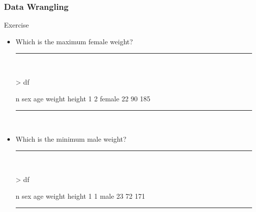 \documentclass{beamer}
\begin{document}
\begin{frame}[fragile]
	\frametitle{Data Wrangling}
	\centering \LARGE Exercise
	\begin{itemize}
		\small
		\item Which is the maximum female weight? 
\rule{\textwidth}{0.4pt}\\
\tiny
\setlength{\fancyvrbtopsep}{-1pt}
\setlength{\fancyvrbpartopsep}{-1pt}
\begin{Schunk}
\begin{Sinput}
> df %
\end{Sinput}
\begin{Soutput}
  n    sex age weight height
1 2 female  22     90    185
\end{Soutput}
\end{Schunk}
\rule{\textwidth}{0.4pt}\\
\small
		\item Which is the minimum male weight? 
\rule{\textwidth}{0.4pt}\\
\tiny
\setlength{\fancyvrbtopsep}{-1pt}
\setlength{\fancyvrbpartopsep}{-1pt}
\begin{Schunk}
\begin{Sinput}
> df %
\end{Sinput}
\begin{Soutput}
  n  sex age weight height
1 1 male  23     72    171
\end{Soutput}
\end{Schunk}
\rule{\textwidth}{0.4pt}\\
\small
\end{itemize}
\end{frame}
\end{document}
